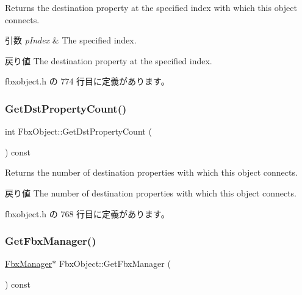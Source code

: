 Returns the destination property at the specified index with which this object connects. 
\begin{DoxyParams}{引数}
{\em p\+Index} & The specified index. \\
\hline
\end{DoxyParams}
\begin{DoxyReturn}{戻り値}
The destination property at the specified index. 
\end{DoxyReturn}


 fbxobject.\+h の 774 行目に定義があります。

\mbox{\label{class_fbx_object_a878feb5a29caf3262360037fe4a5c1e6}} 
\subsubsection{\texorpdfstring{Get\+Dst\+Property\+Count()}{GetDstPropertyCount()}}
{\footnotesize\ttfamily int Fbx\+Object\+::\+Get\+Dst\+Property\+Count (\begin{DoxyParamCaption}{ }\end{DoxyParamCaption}) const\hspace{0.3cm}{\ttfamily [inline]}}

Returns the number of destination properties with which this object connects. \begin{DoxyReturn}{戻り値}
The number of destination properties with which this object connects. 
\end{DoxyReturn}


 fbxobject.\+h の 768 行目に定義があります。

\mbox{\label{class_fbx_object_aa9871c290d977c2ef1c268193699863c}} 
\subsubsection{\texorpdfstring{Get\+Fbx\+Manager()}{GetFbxManager()}}
{\footnotesize\ttfamily \hyperlink{class_fbx_manager}{Fbx\+Manager}$\ast$ Fbx\+Object\+::\+Get\+Fbx\+Manager (\begin{DoxyParamCaption}{ }\end{DoxyParamCaption}) const}

